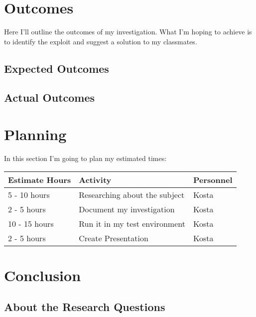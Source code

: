 \documentclass[12pt, letterpaper]{article}
\begin{document}
\section{Outcomes}
Here I'll outline the outcomes of my investigation. What I'm hoping to achieve is to identify the exploit and suggest a solution to my classmates.

\subsection{Expected Outcomes}


\subsection{Actual Outcomes}


\newpage
\section{Planning}
In this section I'm going to plan my estimated times:
\hfill\break
    \begin{table}[htbp]
        \begin{tabular}{|l|l|l|}
            \hline
            Estimate Hours & Activity    & Personnel    \tabularnewline \hline
            5 - 10 hours   & Researching about the subject & Kosta \tabularnewline \hline
            2 - 5 hours  & Document my investigation & Kosta \tabularnewline 
            \hline
            10 - 15 hours & Run it in my test environment & Kosta \tabularnewline \hline
            2 - 5 hours & Create Presentation & Kosta \tabularnewline \hline
        \end{tabular}
    \end{table}

\section{Conclusion}




\subsection{About the Research Questions}
\end{document}
